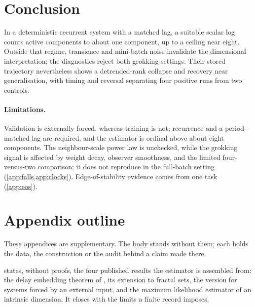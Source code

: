 \documentclass{article}
\newenvironment{claude}{\color{claudecolor}}{}
\begin{document}
\section{Conclusion}\label{sec:concl}

In a deterministic recurrent system with a matched lag, a suitable scalar log counts active
components to about one component, up to a ceiling near eight. Outside that regime, transience and
mini-batch noise invalidate the dimensional interpretation; the diagnostics reject both grokking
settings. Their stored trajectory nevertheless shows a detrended-rank collapse and recovery near
generalisation, with timing and reversal separating four positive runs from two controls.
\begin{claude}
\paragraph{Limitations.} Validation is externally forced, whereas training is not; recurrence and a
period-matched lag are required, and the estimator is ordinal above about eight components. The
neighbour-scale power law is unchecked, while the grokking signal is affected by weight decay,
observer smoothness, and the limited four-versus-two comparison; it does not reproduce in the
full-batch setting (\cref{app:falls,app:clocks}). Edge-of-stability evidence comes from one task
(\cref{app:eos}).
\end{claude}




\appendix
{}

\section*{Appendix outline}

These appendices are supplementary. The body stands without them; each holds the data, the
construction or the audit behind a claim made there.

\textbf{} states, without proofs, the four published results the estimator is
assembled from: the delay embedding theorem of \citet{takens1981detecting}, its extension to fractal sets, the version for systems
forced by an external input, and the maximum likelihood
estimator of an intrinsic dimension. It closes with the limits a finite record imposes.
\end{document}
